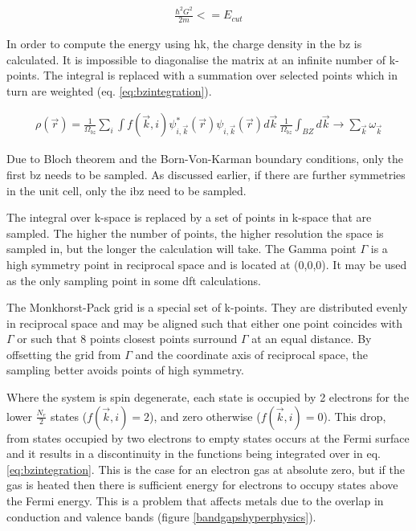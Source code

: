  \begin{equation}
   \begin{split}
     \frac{\hbar^2 G^2}{2m} <= E_{cut}
   \end{split}
   \label{eq:planewaveecutoff}
 \end{equation}


In order to compute the energy using \acrshort{hk}, the charge density in the \acrshort{bz} is calculated.  It is impossible to diagonalise the matrix at an infinite number of k-points.  The integral is replaced with a summation over selected points which in turn are weighted (eq. \ref{eq:bzintegration})\cite{bzsampling}.  

\begin{equation}
\begin{split}
\rho(\vec{r}) = \frac{1}{\Omega_{bz}} \sum_{i} \int f(\vec{k}, i) \psi^{*}_{i, \vec{k}}(\vec{r}) \psi_{i, \vec{k}} (\vec{r}) d\vec{k} \
\frac{1}{\Omega_{bz}} \int_{BZ} d\vec{k} \rightarrow \sum_{\vec{k}} \omega_{\vec{k}}
\end{split}
\label{eq:bzintegration}
\end{equation}

Due to Bloch theorem and the Born-Von-Karman boundary conditions, only the first \acrshort{bz} needs to be sampled.  As discussed earlier, if there are further symmetries in the unit cell, only the \acrshort{ibz} need to be sampled.

The integral over k-space is replaced by a set of points in k-space that are sampled.  The higher the number of points, the higher resolution the space is sampled in, but the longer the calculation will take.  The Gamma point $\Gamma$ is a high symmetry point in reciprocal space and is located at (0,0,0).  It may be used as the only sampling point in some \acrshort{dft} calculations.

The Monkhorst-Pack grid is a special set of k-points.  They are distributed evenly in reciprocal space and may be aligned such that either one point coincides with $\Gamma$ or such that 8 points closest points surround $\Gamma$ at an equal distance.  By offsetting the grid from $\Gamma$ and the coordinate axis of reciprocal space, the sampling better avoids points of high symmetry.   

Where the system is spin degenerate, each state is occupied by 2 electrons for the lower $\frac{N_e}{2}$ states ($f(\vec{k}, i) = 2$), and zero otherwise ($f(\vec{k}, i) = 0$)\cite{marzarithesis1}.  This drop, from states occupied by two electrons to empty states occurs at the Fermi surface and it results in a discontinuity in the functions being integrated over in eq. \ref{eq:bzintegration}.  This is the case for an electron gas at absolute zero, but if the gas is heated then there is sufficient energy for electrons to occupy states above the Fermi energy.  This is a problem that affects metals due to the overlap in conduction and valence bands (figure \ref{bandgapshyperphysics}).

